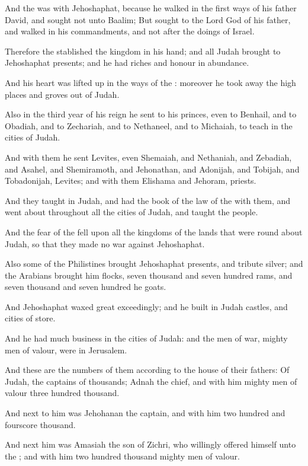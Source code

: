 \verse And the \LORD was with Jehoshaphat, because he walked in the first ways of his father David, and sought not unto Baalim; \verse But sought to the Lord God of his father, and walked in his commandments, and not after the doings of Israel.

\verse Therefore the \LORD stablished the kingdom in his hand; and all Judah brought to Jehoshaphat presents; and he had riches and honour in abundance.

\verse And his heart was lifted up in the ways of the \LORD: moreover he took away the high places and groves out of Judah.

\verse Also in the third year of his reign he sent to his princes, even to Benhail, and to Obadiah, and to Zechariah, and to Nethaneel, and to Michaiah, to teach in the cities of Judah.

\verse And with them he sent Levites, even Shemaiah, and Nethaniah, and Zebadiah, and Asahel, and Shemiramoth, and Jehonathan, and Adonijah, and Tobijah, and Tobadonijah, Levites; and with them Elishama and Jehoram, priests.

\verse And they taught in Judah, and had the book of the law of the \LORD with them, and went about throughout all the cities of Judah, and taught the people.

\verse And the fear of the \LORD fell upon all the kingdoms of the lands that were round about Judah, so that they made no war against Jehoshaphat.

\verse Also some of the Philistines brought Jehoshaphat presents, and tribute silver; and the Arabians brought him flocks, seven thousand and seven hundred rams, and seven thousand and seven hundred he goats.

\verse And Jehoshaphat waxed great exceedingly; and he built in Judah castles, and cities of store.

\verse And he had much business in the cities of Judah: and the men of war, mighty men of valour, were in Jerusalem.

\verse And these are the numbers of them according to the house of their fathers: Of Judah, the captains of thousands; Adnah the chief, and with him mighty men of valour three hundred thousand.

\verse And next to him was Jehohanan the captain, and with him two hundred and fourscore thousand.

\verse And next him was Amasiah the son of Zichri, who willingly offered himself unto the \LORD; and with him two hundred thousand mighty men of valour.

